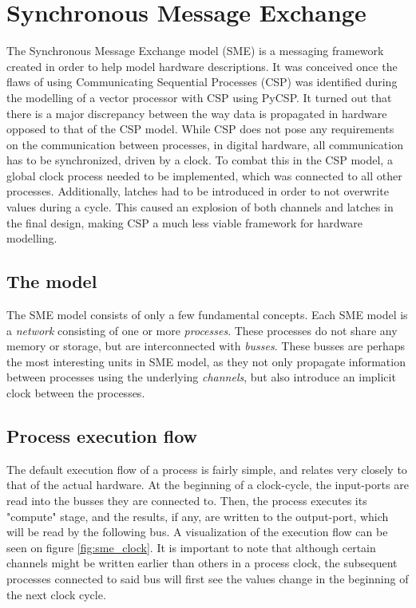 \section{Synchronous Message Exchange}
The Synchronous Message Exchange
model (SME) is a messaging framework created in order to help model
hardware descriptions\cite{sme_for_hardware_designs}.  It was conceived
once the flaws of using Communicating Sequential Processes (CSP) was
identified during the modelling of a vector processor with CSP using
PyCSP\cite{PyCSP}.  It turned out that there is a major discrepancy
between the way data is propagated in hardware opposed to that of the
CSP model. While CSP does not pose any requirements on the communication
between processes, in digital hardware, all communication has to be
synchronized, driven by a clock. To combat this in the CSP model, a
global clock process needed to be implemented, which was connected to
all other processes. Additionally, latches had to be introduced in order
to not overwrite values during a cycle. This caused an explosion of both
channels and latches in the final design, making CSP a much less viable
framework for hardware modelling\cite{sme_for_hardware_designs}.

\subsection{The model} The SME model consists of only a few fundamental
concepts. Each SME model is a \textit{network} consisting of one or more
\textit{processes}. These processes do not share any memory or storage,
but are interconnected with \textit{busses}.  These busses are perhaps
the most interesting units in SME model, as they not only propagate
information between processes using the underlying \textit{channels},
but also introduce an implicit clock between the processes.\\

\subsection{Process execution flow}
The default execution flow of a process is
fairly simple, and relates very closely to that of the actual hardware. At
the beginning of a clock-cycle, the input-ports are read into the busses
they are connected to. Then, the process executes its "compute" stage, and
the results, if any, are written to the output-port, which will be read
by the following bus. A visualization of the execution flow can be seen
on figure \ref{fig:sme_clock}.
It is important to note that although certain channels might be written earlier
than others in a process clock, the subsequent processes connected to said bus
will first see the values change in the beginning of the next clock
cycle.

